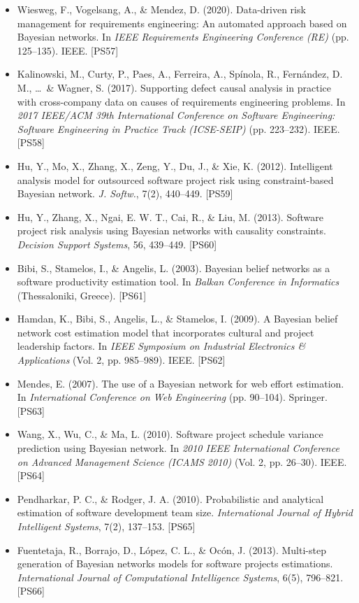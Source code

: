\begin{itemize}
\item Wiesweg, F., Vogelsang, A., \& Mendez, D. (2020).
Data-driven risk management for requirements engineering: An automated approach based on Bayesian networks.
In \textit{IEEE Requirements Engineering Conference (RE)} (pp. 125--135). IEEE. [PS57]

\item Kalinowski, M., Curty, P., Paes, A., Ferreira, A., Spínola, R., Fernández, D. M., \ldots\ \& Wagner, S. (2017).
Supporting defect causal analysis in practice with cross-company data on causes of requirements engineering problems.
In \textit{2017 IEEE/ACM 39th International Conference on Software Engineering: Software Engineering in Practice Track (ICSE-SEIP)} (pp. 223--232). IEEE. [PS58]

\item Hu, Y., Mo, X., Zhang, X., Zeng, Y., Du, J., \& Xie, K. (2012).
Intelligent analysis model for outsourced software project risk using constraint-based Bayesian network.
\textit{J. Softw.}, 7(2), 440--449. [PS59]

\item Hu, Y., Zhang, X., Ngai, E. W. T., Cai, R., \& Liu, M. (2013).
Software project risk analysis using Bayesian networks with causality constraints.
\textit{Decision Support Systems}, 56, 439--449. [PS60]

\item Bibi, S., Stamelos, I., \& Angelis, L. (2003).
Bayesian belief networks as a software productivity estimation tool.
In \textit{Balkan Conference in Informatics} (Thessaloniki, Greece). [PS61]

\item Hamdan, K., Bibi, S., Angelis, L., \& Stamelos, I. (2009).
A Bayesian belief network cost estimation model that incorporates cultural and project leadership factors.
In \textit{IEEE Symposium on Industrial Electronics \& Applications} (Vol. 2, pp. 985--989). IEEE. [PS62]

\item Mendes, E. (2007).
The use of a Bayesian network for web effort estimation.
In \textit{International Conference on Web Engineering} (pp. 90--104). Springer. [PS63]

\item Wang, X., Wu, C., \& Ma, L. (2010).
Software project schedule variance prediction using Bayesian network.
In \textit{2010 IEEE International Conference on Advanced Management Science (ICAMS 2010)} (Vol. 2, pp. 26--30). IEEE. [PS64]

\item Pendharkar, P. C., \& Rodger, J. A. (2010).
Probabilistic and analytical estimation of software development team size.
\textit{International Journal of Hybrid Intelligent Systems}, 7(2), 137--153. [PS65]

\item Fuentetaja, R., Borrajo, D., López, C. L., \& Ocón, J. (2013).
Multi-step generation of Bayesian networks models for software projects estimations.
\textit{International Journal of Computational Intelligence Systems}, 6(5), 796--821. [PS66]

\end{itemize}
\normalsize
